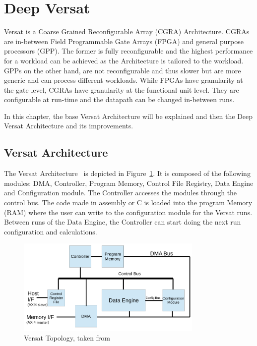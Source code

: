 \section{Deep Versat}
\label{sector:DeepVersat}

\quad Versat is a Coarse Grained Reconfigurable Array (CGRA) Architecture. CGRAs are in-between Field Programmable Gate Arrays (FPGA)
 and general purpose processors (GPP).
The former is fully reconfigurable and the highest performance for a workload can be achieved as the Architecture is tailored to the workload.
GPPs on the other hand, are not reconfigurable and thus slower but are more generic and can process different workloads.
While FPGAs have granularity at the gate level, CGRAs have granularity at the functional unit level. They are configurable at run-time and the datapath can be
changed in-between runs.   

In this chapter, the base Versat Architecture will be explained and then the Deep Versat Architecture
 and its improvements.

\subsection{Versat Architecture}

\quad The Versat Architecture~\cite{sousa:compiler,sousa:controller,sousa:FFT,sousa:versat2016} 
is depicted in Figure~\ref{figure:oldversat}. It is composed of the following modules: DMA, Controller, Program Memory, Control File Registry, Data Engine and Configuration module.
The Controller accesses the modules through the control bus. The code made in assembly or C is loaded into the program Memory (RAM) where the user
can write to the configuration module for the Versat runs. Between runs of the Data Engine,
 the Controller can start doing the next run configuration and calculations.


\begin{figure}[!htbp]
    \centering
    \includegraphics[width=0.8\textwidth]{Figures/top.png}
    \caption{Versat Topology, taken from~\cite{sousa:controller}}
    \label{figure:oldversat}
\end{figure} 

